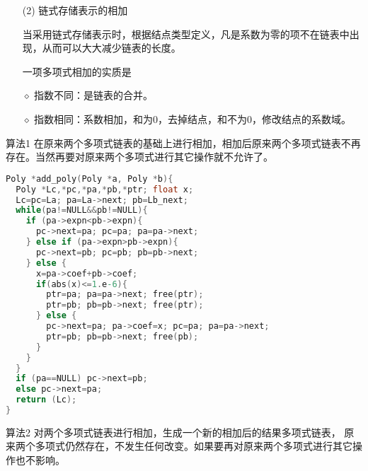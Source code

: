\begin{frame}[fragile]
\begin{itemize}
\item[(2)] 链式存储表示的相加
\item[]当采用链式存储表示时，根据结点类型定义，凡是系数为零的项不在链表中出现，从而可以大大减少链表的长度。\\[0.1in]
\item[]
一项多项式相加的实质是
\item[$\diamond$]
指数不同：是链表的合并。
\item[$\diamond$]
指数相同：系数相加，和为0，去掉结点，和不为0，修改结点的系数域。
\end{itemize}
\end{frame}

\begin{frame}[fragile]
\begin{block}{算法1}
在原来两个多项式链表的基础上进行相加，相加后原来两个多项式链表不再存在。当然再要对原来两个多项式进行其它操作就不允许了。
\end{block}
\end{frame}

\begin{frame}
\begin{lstlisting}[language=C,frame=none,extendedchars=false]
Poly *add_poly(Poly *a, Poly *b){
  Poly *Lc,*pc,*pa,*pb,*ptr; float x;
  Lc=pc=La; pa=La->next; pb=Lb_next;
  while(pa!=NULL&&pb!=NULL){
    if (pa->expn<pb->expn){
      pc->next=pa; pc=pa; pa=pa->next;
    } else if (pa->expn>pb->expn){
      pc->next=pb; pc=pb; pb=pb->next;
    } else {
      x=pa->coef+pb->coef;
      if(abs(x)<=1.e-6){
        ptr=pa; pa=pa->next; free(ptr);
        ptr=pb; pb=pb->next; free(ptr);
      } else {
        pc->next=pa; pa->coef=x; pc=pa; pa=pa->next;
        ptr=pb; pb=pb->next; free(pb);
      }
    }
  }
  if (pa==NULL) pc->next=pb;
  else pc->next=pa;
  return (Lc);
}
\end{lstlisting}
\end{frame}	

\begin{frame}[fragile]
\begin{block}{算法2}
对两个多项式链表进行相加，生成一个新的相加后的结果多项式链表，
原来两个多项式仍然存在，不发生任何改变。如果要再对原来两个多项式进行其它操作也不影响。
\end{block}
\end{frame}

